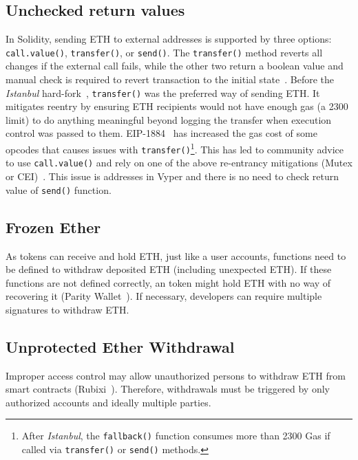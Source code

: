 
\subsection{Unchecked return values}\label{subsec:urv}
In Solidity, sending ETH to external addresses is supported by three options: \texttt{call.value()}, \texttt{transfer()}, or \texttt{send()}. The \texttt{transfer()} method reverts all changes if the external call fails, while the other two return a boolean value and manual check is required to revert transaction to the initial state~\cite{SoliditySendEther}. Before the \textit{Istanbul} hard-fork~\cite{IstanbulUpgrades}, \texttt{transfer()} was the preferred way of sending ETH. It mitigates reentry by ensuring ETH recipients would not have enough gas (\ie a 2300 limit) to do anything meaningful beyond logging the transfer when execution control was passed to them. EIP-1884~\cite{EIP1884} has increased the gas cost of some opcodes that causes issues with \texttt{transfer()}\footnote{After \textit{Istanbul}, the \texttt{fallback()} function consumes more than 2300 Gas if called via \texttt{transfer()} or \texttt{send()} methods.}. This has led to community advice to use \texttt{call.value()} and rely on one of the above re-entrancy mitigations (\ie Mutex or CEI)~\cite{WiKiMutex,CEI}. This issue is addresses in Vyper and there is no need to check return value of \texttt{send()} function.

\subsection{Frozen Ether}\label{subsec:feth}
As \erc tokens can receive and hold ETH, just like a user accounts, functions need to be defined to withdraw deposited ETH (including unexpected ETH). If these functions are not defined correctly, an \erc token might hold ETH with no way of recovering it (\cf Parity Wallet~\cite{ParityWalletHack}). If necessary, developers can require multiple signatures to withdraw ETH.

\subsection{Unprotected Ether Withdrawal}\label{subsec:uew}
Improper access control may allow unauthorized persons to withdraw ETH from smart contracts (\cf Rubixi~\cite{Rubixi}). Therefore, withdrawals must be triggered by only authorized accounts and ideally multiple parties.

